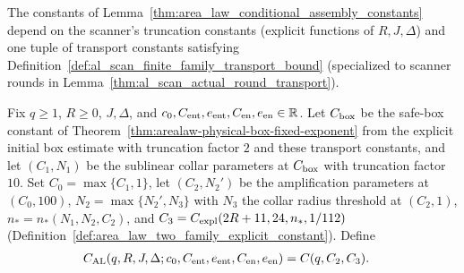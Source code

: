 The constants of Lemma~\ref{thm:area_law_conditional_assembly_constants}
depend on the scanner's truncation constants (explicit functions of $R,J,\Delta$) and one tuple of transport constants satisfying Definition~\ref{def:al_scan_finite_family_transport_bound} (specialized to scanner rounds in Lemma~\ref{thm:al_scan_actual_round_transport}).

\begin{definition}
    \label{def:area_law_transport_constant}
    \leanok
    Fix $q\ge1$, $R\ge0$, $J,\Delta$, and $c_0,C_{\rm ent},e_{\rm ent},C_{\rm en},e_{\rm en}\in\mathbb R$. Let $C_{\rm box}$ be
    the safe-box constant of Theorem~\ref{thm:arealaw-physical-box-fixed-exponent} from the explicit initial box estimate with truncation factor $2$ and these transport constants, and let $(C_1,N_1)$ be the sublinear collar parameters at $C_{\rm box}$ with truncation factor $10$. Set
    $C_0=\max\{C_1,1\}$, let $(C_2,N_2')$ be the amplification parameters at $(C_0,100)$, $N_2=\max\{N_2',N_3\}$ with $N_3$ the collar radius threshold at $(C_2,1)$, $n_*=n_*(N_1,N_2,C_2)$, and
    $C_3=C_{\rm expl}(2R+11,24,n_*,1/112)$ (Definition~\ref{def:area_law_two_family_explicit_constant}). Define
    \begin{align}
        C_{\rm AL}(q,R,J,\Delta;c_0,C_{\rm ent},e_{\rm ent},C_{\rm en},e_{\rm en})
         & =C(q,C_2,C_3).
        \label{eq:area_law_transport_constant}
    \end{align}
\end{definition}

